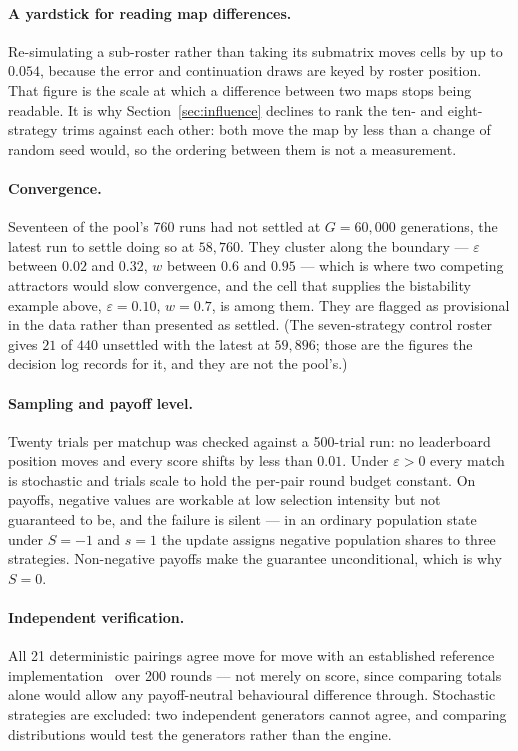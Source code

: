 \documentclass[11pt,a4paper]{article}
\newcommand{\eps}{\varepsilon}
\begin{document}
\paragraph{A yardstick for reading map differences.}
Re-simulating a sub-roster rather than taking its submatrix moves cells by up to
$0.054$, because the error and continuation draws are keyed by roster position.
That figure is the scale at which a difference between two maps stops being
readable. It is why Section~\ref{sec:influence} declines to rank the ten- and
eight-strategy trims against each other: both move the map by less than a change
of random seed would, so the ordering between them is not a measurement.

\paragraph{Convergence.}
Seventeen of the pool's 760 runs had not settled at $G = 60{,}000$ generations,
the latest run to settle doing so at $58{,}760$. They cluster along the boundary
--- $\eps$ between $0.02$ and $0.32$, $w$ between $0.6$ and $0.95$ --- which is
where two competing attractors would slow convergence, and the cell that
supplies the bistability example above, $\eps = 0.10$, $w = 0.7$, is among them.
They are flagged as provisional in the data rather than presented as settled.
(The seven-strategy control roster gives $21$ of $440$ unsettled with the latest
at $59{,}896$; those are the figures the decision log records for it, and they
are not the pool's.)

\paragraph{Sampling and payoff level.}
Twenty trials per matchup was checked against a 500-trial run: no leaderboard
position moves and every score shifts by less than $0.01$. Under $\eps > 0$ every
match is stochastic and trials scale to hold the per-pair round budget constant.
On payoffs, negative values are workable at low selection intensity but not
guaranteed to be, and the failure is silent --- in an ordinary population state
under $S = -1$ and $s = 1$ the update assigns negative population shares to
three strategies. Non-negative payoffs make the guarantee unconditional, which
is why $S = 0$.

\paragraph{Independent verification.}
All 21 deterministic pairings agree move for move with an established reference
implementation~\cite{knight2016} over 200 rounds --- not merely on score, since
comparing totals alone would allow any payoff-neutral behavioural difference
through. Stochastic strategies are excluded: two independent generators cannot
agree, and comparing distributions would test the generators rather than the
engine.
\end{document}
